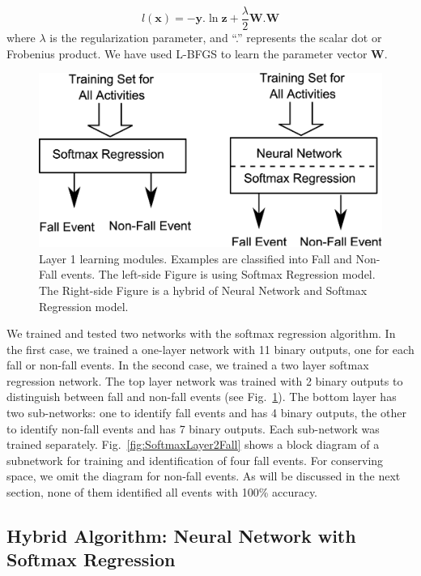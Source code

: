 \documentclass[]{IEEEtran}
\begin{document}
\begin{equation} 
l(\mathbf{x}) = -\mathbf{y}.\ln \mathbf{z} + \frac{\lambda}{2} \mathbf{W}.\mathbf{W}
\label{eq:objective-function}
\end{equation}
 where  $\lambda$ is the regularization parameter, and ``.'' represents the scalar dot  
or Frobenius product.
 We have used L-BFGS \cite{DBLP:conf/icml/LeNCLPN11} to learn the 
parameter vector $\mathbf{W}$.  

\begin{figure}[t]
	\centering
		\includegraphics[width=0.7\columnwidth]{figures/SoftmaxLayer1.eps}
	\caption{Layer 1 learning modules. Examples are classified into Fall
and Non-Fall events.  The left-side Figure is using Softmax Regression model.
The Right-side Figure is a hybrid of Neural Network and Softmax Regression
model.} \label{fig:SoftmaxLayer1}
\end{figure}

We trained and tested two networks with the softmax regression algorithm. In
the first case, we trained a one-layer network with 11 binary outputs, one for
each fall or non-fall events. In the second case, we trained a two layer
softmax regression network. The top layer network was trained with 2 binary
outputs to distinguish between fall and non-fall events (see
Fig.~\ref{fig:SoftmaxLayer1}). The bottom layer has two sub-networks:  one to
identify fall events and has 4 binary outputs, the other to identify non-fall
events and has 7 binary outputs. Each sub-network was trained separately.
Fig.~\ref{fig:SoftmaxLayer2Fall} shows a block diagram of a subnetwork for
training and identification of four fall events. For conserving space, we omit
the diagram for non-fall events. As will be discussed in the next section, none
of them identified all events with 100\% accuracy.


\subsection{Hybrid Algorithm: Neural Network with Softmax Regression}
\label{sec:HybridAlgorithmNeuralNetworkAndSoftmaxRegreation}
\end{document}
